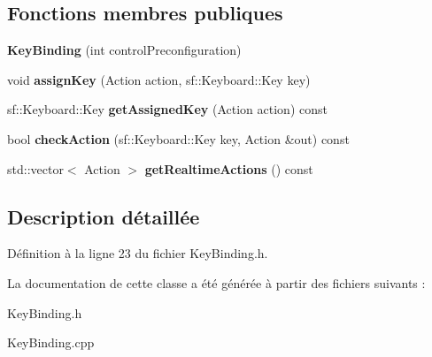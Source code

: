 \subsection*{Fonctions membres publiques}
\begin{DoxyCompactItemize}
\item 
\hypertarget{class_key_binding_aa343e67d4fc402a18994359a8d064df3}{}\label{class_key_binding_aa343e67d4fc402a18994359a8d064df3} 
{\bfseries Key\+Binding} (int control\+Preconfiguration)
\item 
\hypertarget{class_key_binding_a88b4df445ff9d050723710cd75a8cd3f}{}\label{class_key_binding_a88b4df445ff9d050723710cd75a8cd3f} 
void {\bfseries assign\+Key} (Action action, sf\+::\+Keyboard\+::\+Key key)
\item 
\hypertarget{class_key_binding_af55da9ca1a666a2617b7f32a51e1b466}{}\label{class_key_binding_af55da9ca1a666a2617b7f32a51e1b466} 
sf\+::\+Keyboard\+::\+Key {\bfseries get\+Assigned\+Key} (Action action) const
\item 
\hypertarget{class_key_binding_aa11ef504d52c2a05e2a43bc833f28408}{}\label{class_key_binding_aa11ef504d52c2a05e2a43bc833f28408} 
bool {\bfseries check\+Action} (sf\+::\+Keyboard\+::\+Key key, Action \&out) const
\item 
\hypertarget{class_key_binding_a990f9e66f5bc5f07fbd7ef38c1fba64b}{}\label{class_key_binding_a990f9e66f5bc5f07fbd7ef38c1fba64b} 
std\+::vector$<$ Action $>$ {\bfseries get\+Realtime\+Actions} () const
\end{DoxyCompactItemize}


\subsection{Description détaillée}


Définition à la ligne 23 du fichier Key\+Binding.\+h.



La documentation de cette classe a été générée à partir des fichiers suivants \+:\begin{DoxyCompactItemize}
\item 
Key\+Binding.\+h\item 
Key\+Binding.\+cpp\end{DoxyCompactItemize}
